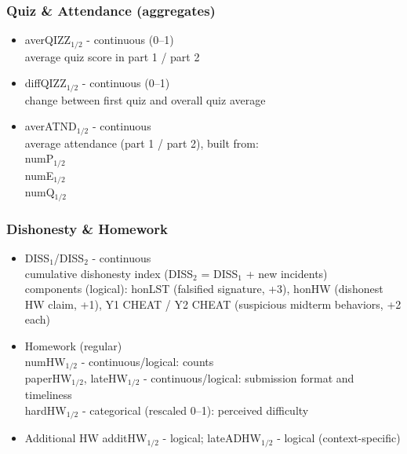 \documentclass{beamer} %
\theoremstyle{definition}
\begin{document}
	\begin{frame}
		\frametitle{Quiz \& Attendance (aggregates)}
		\begin{itemize}
			\item averQIZZ$_{1/2}$ - continuous (0–1)\\  
			\subitem average quiz score in part 1 / part 2
			\item diffQIZZ$_{1/2}$ - continuous (0–1)\\  
			\subitem change between first quiz and overall quiz average
			\item averATND$_{1/2}$ - continuous\\  
			\subitem average attendance (part 1 / part 2), built from:\\
			\subitem numP$_{1/2}$\\
			\subitem numE$_{1/2}$\\
			\subitem numQ$_{1/2}$
		\end{itemize}
	\end{frame}
	
	\begin{frame}
		\frametitle{Dishonesty \& Homework}
		\begin{itemize}
			\item DISS$_{1}$/DISS$_{2}$ - continuous  \\
			\subitem cumulative dishonesty index (DISS$_2$ = DISS$_1$ + new incidents)\\
			\subitem components (logical): honLST (falsified signature, +3), honHW (dishonest HW claim, +1), Y1 CHEAT / Y2 CHEAT (suspicious midterm behaviors, +2 each)
			\item Homework (regular)\\
			\subitem numHW$_{1/2}$ - continuous/logical: counts\\
			\subitem paperHW$_{1/2}$, lateHW$_{1/2}$ - continuous/logical: submission format and timeliness\\
			\subitem hardHW$_{1/2}$ - categorical (rescaled 0–1): perceived difficulty\\
			\item Additional HW
			\subitem additHW$_{1/2}$ - logical; lateADHW$_{1/2}$ - logical (context-specific)
		\end{itemize}
	\end{frame}
	
\end{document}
